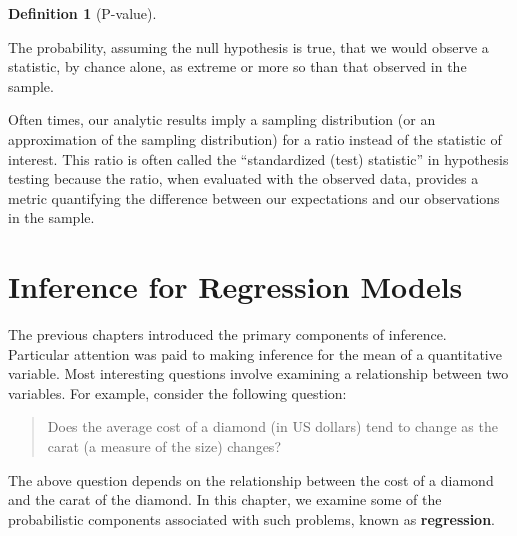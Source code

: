 \documentclass[
  letterpaper,
  DIV=11,
  numbers=noendperiod]{scrreprt}
\theoremstyle{definition}
\newtheorem{definition}{Definition}[chapter]
\theoremstyle{definition}
\theoremstyle{plain}
\theoremstyle{remark}
\begin{document}
\begin{definition}[P-value]\protect\hypertarget{def-pvalue}{}\label{def-pvalue}

The probability, assuming the null hypothesis is true, that we would
observe a statistic, by chance alone, as extreme or more so than that
observed in the sample.

\end{definition}

\begin{tcolorbox}[enhanced jigsaw, title=\textcolor{quarto-callout-note-color}{\faInfo}\hspace{0.5em}{Note}, colbacktitle=quarto-callout-note-color!10!white, titlerule=0mm, toptitle=1mm, breakable, bottomtitle=1mm, colframe=quarto-callout-note-color-frame, opacitybacktitle=0.6, bottomrule=.15mm, arc=.35mm, toprule=.15mm, colback=white, rightrule=.15mm, coltitle=black, leftrule=.75mm, left=2mm, opacityback=0]

Often times, our analytic results imply a sampling distribution (or an
approximation of the sampling distribution) for a ratio instead of the
statistic of interest. This ratio is often called the ``standardized
(test) statistic'' in hypothesis testing because the ratio, when
evaluated with the observed data, provides a metric quantifying the
difference between our expectations and our observations in the sample.

\end{tcolorbox}


\hypertarget{sec-regression}{%
\chapter{Inference for Regression Models}\label{sec-regression}}

The previous chapters introduced the primary components of inference.
Particular attention was paid to making inference for the mean of a
quantitative variable. Most interesting questions involve examining a
relationship between two variables. For example, consider the following
question:

\begin{quote}
Does the average cost of a diamond (in US dollars) tend to change as the
carat (a measure of the size) changes?
\end{quote}

The above question depends on the relationship between the cost of a
diamond and the carat of the diamond. In this chapter, we examine some
of the probabilistic components associated with such problems, known as
\textbf{regression}.
\end{document}
